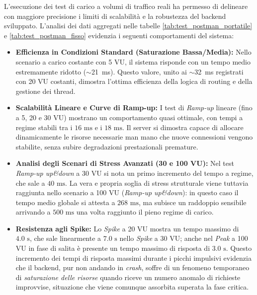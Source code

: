 L'esecuzione dei test di carico a volumi di traffico reali ha permesso di delineare con maggiore precisione i limiti di scalabilità e la robustezza del backend sviluppato. L'analisi dei dati aggregati nelle tabelle \ref{tab:test_postman_portatile} e \ref{tab:test_postman_fisso} evidenzia i seguenti comportamenti del sistema:

\begin{itemize}
    \item \textbf{Efficienza in Condizioni Standard (Saturazione Bassa/Media):} Nello scenario a carico costante con 5 VU, il sistema risponde con un tempo medio estremamente ridotto ($\sim$21~ms). Questo valore, unito ai $\sim$32~ms registrati con 20 VU costanti, dimostra l'ottima efficienza della logica di routing e della gestione dei thread.
    
    \item \textbf{Scalabilità Lineare e Curve di Ramp-up:} I test di \textit{Ramp-up} lineare (fino a 5, 20 e 30 VU) mostrano un comportamento quasi ottimale, con tempi a regime stabili tra i $16\text{ ms}$ e i $18\text{ ms}$. Il server si dimostra capace di allocare dinamicamente le risorse necessarie man mano che nuove connessioni vengono stabilite, senza subire degradazioni prestazionali premature.
    
    \item \textbf{Analisi degli Scenari di Stress Avanzati (30 e 100 VU):} 
    Nel test \textit{Ramp-up up\&down} a 30 VU si nota un primo incremento del tempo a regime, che sale a $40\text{ ms}$. La vera e propria soglia di stress strutturale viene tuttavia raggiunta nello scenario a 100 VU (\textit{Ramp-up up\&down}): in questo caso il tempo medio globale si attesta a $268\text{ ms}$, ma subisce un raddoppio sensibile arrivando a $500\text{ ms}$ una volta raggiunto il pieno regime di carico.
    
    \item \textbf{Resistenza agli Spike:} 
    Lo \textit{Spike} a 20 VU mostra un tempo massimo di $4.0\text{ s}$, che sale linearmente a $7.0\text{ s}$ nello \textit{Spike} a 30 VU; anche nel \textit{Peak} a 100 VU in fase di salita è presente un tempo massimo di risposta di $3.0\text{ s}$. Questo incremento dei tempi di risposta massimi durante i picchi impulsivi evidenzia che il backend, pur non andando in \textit{crash}, soffre di un fenomeno temporaneo di \textit{saturazione delle risorse} quando riceve un numero anomalo di richieste improvvise, situazione che viene comunque assorbita superata la fase critica.
\end{itemize}

